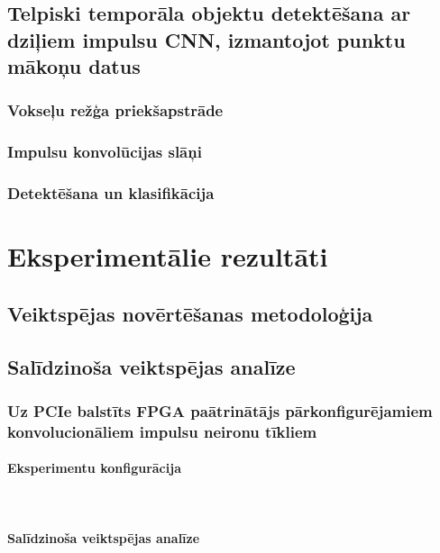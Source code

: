 \documentclass[a4paper, 12pt]{article}
\begin{document}
\subsection{Telpiski temporāla objektu detektēšana ar dziļiem impulsu CNN, izmantojot punktu mākoņu datus}
  
  \subsubsection{Vokseļu režģa priekšapstrāde}
  
  \subsubsection{Impulsu konvolūcijas slāņi}
  
  \subsubsection{Detektēšana un klasifikācija}
  

\section{Eksperimentālie rezultāti}

\subsection{Veiktspējas novērtēšanas metodoloģija}

\subsection{Salīdzinoša veiktspējas analīze}
  \subsubsection{Uz PCIe balstīts FPGA paātrinātājs pārkonfigurējamiem konvolucionāliem impulsu neironu tīkliem}
    \paragraph{Eksperimentu konfigurācija}\mbox{} \\
    
    \paragraph{Salīdzinoša veiktspējas analīze}\mbox{} \\
  
\end{document}
